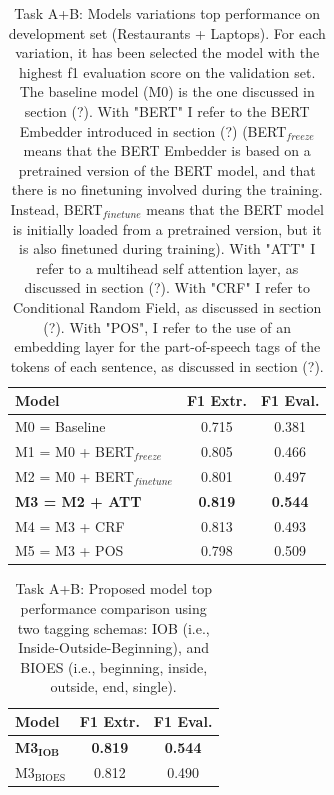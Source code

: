 \documentclass[11pt,a4paper]{article}
\begin{document}
	
	\begin{table}[H]
		\centering
		\begin{tabular}{@{}lcc@{}}
			\toprule
			\textbf{Model}         & F1 Extr.       & F1 Eval.       \\ \midrule
			M0 = Baseline          & 0.715          & 0.381          \\
			M1 = M0 + BERT$_{freeze}$         & 0.805          & 0.466          \\
			M2 = M0 + BERT$_{finetune}$        & 0.801          & 0.497          \\
			\textbf{M3 = M2 + ATT} & \textbf{0.819} & \textbf{0.544} \\
			\midrule
			M4 = M3 + CRF          & 0.813          & 0.493          \\
			M5 = M3 + POS          & 0.798          & 0.509          \\ \bottomrule
		\end{tabular}
		\caption{Task A+B: Models variations top performance on development set
			(Restaurants + Laptops). For each variation, it has been selected the model with
			the highest f1 evaluation score on the validation set. \\ The baseline model
			(M0) is the one discussed in section (?). With "BERT" I refer to the BERT
			Embedder introduced in section (?) (BERT$_{freeze}$ means that the BERT Embedder
			is based on a pretrained version of the BERT model, and that there is no
			finetuning involved during the training. Instead, BERT$_{finetune}$ means that
			the BERT model is initially loaded from a pretrained version, but it is also
			finetuned during training). With "ATT" I refer to a multihead self attention
			layer, as discussed in section (?). With "CRF" I refer to Conditional Random
			Field, as discussed in section (?). With "POS", I refer to the use of an
			embedding layer for the part-of-speech tags of the tokens of each sentence, as
			discussed in section (?).}
		\label{tab:ab_ablation}
	\end{table}
	
	\begin{table}[H]
		\centering
		\begin{tabular}{@{}lcc@{}}
			\toprule
			\textbf{Model}                        & F1 Extr.       & F1 Eval.       \\
			\midrule
			\textbf{M3$_{\mathbf{IOB}}$} & \textbf{0.819} & \textbf{0.544} \\
			M3$_{\mathrm{BIOES}}$                         & 0.812          & 0.490       
			\\ \bottomrule
		\end{tabular}
		\caption{Task A+B: Proposed model top performance comparison using two tagging
			schemas: IOB (i.e., Inside-Outside-Beginning), and BIOES (i.e., beginning,
			inside, outside, end, single).}
		\label{tab:ab_iob_bioes}
	\end{table}
	
\end{document}

